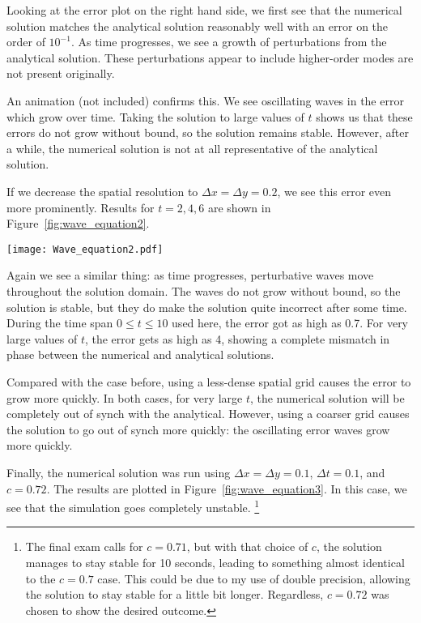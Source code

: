 \documentclass[twocolumn]{myarticle}
\numberwithin{equation}{section}
\begin{document}
Looking at the error plot on the right hand side, we first see that the numerical solution matches the analytical solution reasonably well with an error on the order of $ 10^{-1} $.
As time progresses, we see a growth of perturbations from the analytical solution.
These perturbations appear to include higher-order modes are not present originally.

An animation (not included) confirms this.
We see oscillating waves in the error which grow over time.
Taking the solution to large values of $ t $ shows us that these errors do not grow without bound, so the solution remains stable.
However, after a while, the numerical solution is not at all representative of the analytical solution.

If we decrease the spatial resolution to $ \Delta x = \Delta y = 0.2 $, we see this error even more prominently.
Results for $ t = 2, 4, 6 $ are shown in Figure~\ref{fig:wave_equation2}.

\begin{figure*}[ht]
    \centering
    \texttt{[image: Wave\_equation2.pdf]}
    \caption{Solution to the 2D wave equation with $ \Delta x = \Delta y = 0.2 $ at $ t = 2, 4, 6 $.}
    \label{fig:wave_equation2}
\end{figure*}

Again we see a similar thing: as time progresses, perturbative waves move throughout the solution domain.
The waves do not grow without bound, so the solution is stable, but they do make the solution quite incorrect after some time.
During the time span $ 0 \leq t \leq 10 $ used here, the error got as high as 0.7.
For very large values of $ t $, the error gets as high as 4, showing a complete mismatch in phase between the numerical and analytical solutions.

Compared with the case before, using a less-dense spatial grid causes the error to grow more quickly.
In both cases, for very large $ t $, the numerical solution will be completely out of synch with the analytical.
However, using a coarser grid causes the solution to go out of synch more quickly: the oscillating error waves grow more quickly.

Finally, the numerical solution was run using $ \Delta x = \Delta y = 0.1 $, $ \Delta t = 0.1 $, and $ c = 0.72 $.
The results are plotted in Figure~\ref{fig:wave_equation3}.
In this case, we see that the simulation goes completely unstable.
\footnote{The final exam calls for $ c = 0.71 $, but with that choice of $ c $, the solution manages to stay stable for 10 seconds, leading to something almost identical to the $ c = 0.7 $ case.
This could be due to my use of double precision, allowing the solution to stay stable for a little bit longer.
Regardless, $ c = 0.72 $ was chosen to show the desired outcome.}
\end{document}
